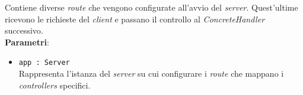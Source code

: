 \begin{itemize}
\begin{itemize}
		Contiene diverse \textit{route} che vengono configurate all'avvio del \textit{server}. Quest'ultime ricevono le richieste del \textit{client} e passano il controllo al \textit{ConcreteHandler} successivo. \\
		\textbf{Parametri}:
		\begin{itemize}
		\item \texttt{app : Server} \\
		Rappresenta l'istanza del \textit{server} su cui configurare i \textit{route} che mappano i \textit{controllers} specifici.
		\end{itemize}
		\end{itemize}
	\end{itemize}